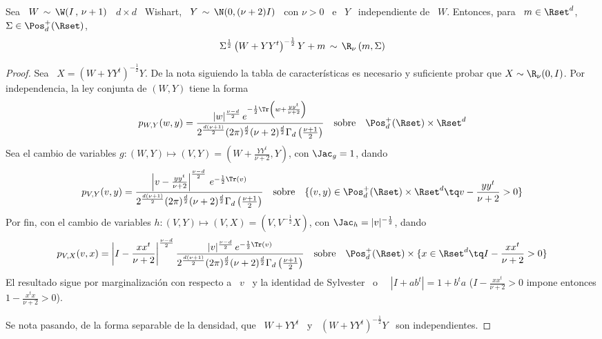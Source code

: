 \begin{lema}\label{Lem:MP:StudentWishart}

%
  Sea \ $W \, \sim \, \W( I \, ,  \, \nu+1)$ \ $d \times d$ \ Wishart, \ $Y \,
  \sim  \, \N(0, (\nu+2)  I)$  \ con  $\nu  >  0$ \  e  \ $Y$  \  independiente de  \
  $W$. Entonces, para \ $m \in \Rset^d$, \ $\Sigma \in \Pos_d^+(\Rset)$,
  \[
  \Sigma^{\frac12}  \left(  W +  Y  Y^t  \right)^{-\frac12} Y  +  m  \, \sim  \,
  \R_\nu\left( m , \Sigma \right)
  \]
\end{lema}
\begin{proof}
  Sea \ $X  = \left( W + Y  Y^t \right)^{-\frac12} Y$.  De la  nota siguiendo la
  tabla  de caracter\'isticas  es  necesario  y suficiente  probar  que $X  \sim
  \R_\nu(0,I)$.  Por independencia, la ley conjunta de $(W,Y)$ tiene la forma
  \[
  p_{W,Y}(w,y)  =  \frac{|w|^{\frac{\nu-d}{2}}  \,  e^{-\frac12  \Tr\left(  w  +
        \frac{y      y^t}{\nu+2}\right)}}{2^{\frac{d       (\nu+1)}{2}}      (2
    \pi)^{\frac{d}{2}}   (\nu+2)^{\frac{d}{2}}   \Gamma_d\left(  \frac{\nu+1}{2}
    \right)} \quad \mbox{sobre} \quad \Pos_d^+(\Rset) \times \Rset^d
  \]
  Sea  el cambio  de variables  $g: (W,Y)  \mapsto (V,Y)  = \left(  W  + \frac{Y
      Y^t}{\nu+2} , Y \right)$, con $\Jac_g = 1$, dando
  \[
  p_{V,Y}(v,y) = \frac{\left|  v - \frac{y y^t}{\nu+2} \right|^{\frac{\nu-d}{2}}
    \,   e^{-\frac12   \Tr\left(    v   \right)}}{2^{\frac{d   (\nu+1)}{2}}   (2
    \pi)^{\frac{d}{2}}   (\nu+2)^{\frac{d}{2}}   \Gamma_d\left(  \frac{\nu+1}{2}
    \right)}  \quad  \mbox{sobre} \quad  \{  (v,y)  \in \Pos_d^+(\Rset)  \times
  \Rset^d \tq v - \frac{y y^t}{\nu+2} > 0 \}
  \]
  Por fin,  con el  cambio de  variables $h: (V,Y)  \mapsto (V,X)  = \left(  V ,
    V^{-\frac12} X \right)$, con $\Jac_h = |v|^{-\frac12}$, dando
 \[
  p_{V,X}(v,x) = \left|  I - \frac{x x^t}{\nu+2} \right|^{\frac{\nu-d}{2}} \frac{|v|^{\frac{\nu-d}{2}}
    \,   e^{-\frac12   \Tr\left(    v   \right)}}{2^{\frac{d   (\nu+1)}{2}}   (2
    \pi)^{\frac{d}{2}}   (\nu+2)^{\frac{d}{2}}   \Gamma_d\left(  \frac{\nu+1}{2}
    \right)} \quad \mbox{sobre}  \quad \Pos_d^+(\Rset)  \times \{  x \in 
  \Rset^d \tq I - \frac{x x^t}{\nu+2} > 0 \}
  \]
  El resultado sigue por marginalizaci\'on con  respecto a \ $v$ \ y la identidad
  de Sylvester~\cite{Syl51} o~\cite[\S~18.1]{Har08} \  $\left| I + a b^t \right|
  = 1  + b^t a$ ($I  - \frac{x x^t}{\nu+2} >  0$ impone entonces  $1 - \frac{x^t
    x}{\nu+2} > 0$).

  Se nota pasando, de  la forma separable de la densidad, que \  $W+Y Y^t$ \ y \
  $(W+Y Y^t)^{-\frac12} Y$ \ son independientes.
\end{proof}

